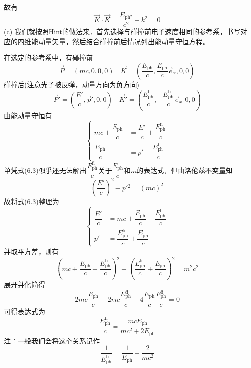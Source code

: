 \begin{solution}
故有
\[\vec{K}\cdot\vec{K}=\dfrac{E_{\mathrm{ph}{}^2}}{c^2}-k^2=0\]
(c) 我们就按照Hint的做法来，首先选择与碰撞前电子速度相同的参考系，书写对应的四维能动量矢量，然后结合碰撞前后情况列出能动量守恒方程。

在选定的参考系中，有碰撞前
\begin{equation}
	\vec{P} = (mc,0,0,0)\quad\vec{K}=(\dfrac{E_{\mathrm{ph}}}{c},\dfrac{E_{\mathrm{ph}}}{c}\vec{e}_x,0,0)
\end{equation}
碰撞后(注意光子被反弹，动量方向为负方向)
\begin{equation}
	\vec{P}'=(\dfrac{E'}{c},\vec{p}',0,0)\quad\vec{K}'=(\dfrac{E_{\mathrm{ph}}^{\mathrm{fi}}}{c},-\dfrac{E_{\mathrm{ph}}^{\mathrm{fi}}}{c}\vec{e}_x,0,0)
\end{equation}
由能动量守恒有
\begin{equation}
	\left\{
		\begin{aligned}
			mc+\dfrac{E_{\mathrm{ph}}}{c}&=\dfrac{E'}{c}+\dfrac{E_{\mathrm{ph}}^{\mathrm{fi}}}{c}\\
			\dfrac{E_{\mathrm{ph}}}{c}&=p'-\dfrac{E_{\mathrm{ph}}^{\mathrm{fi}}}{c}
		\end{aligned}
	\right.
\end{equation}
单凭式(6.3)似乎还无法解出$\dfrac{E_{\mathrm{ph}}^{\mathrm{fi}}}{c}$关于$ \dfrac{E_{\mathrm{ph}}}{c}$和$m$的表达式，但由洛伦兹不变量知
\begin{equation}
	\left(\dfrac{E'}{c}\right)^2-p'{}^2=(mc)^2
\end{equation}
故将式(6.3)整理为
\begin{equation}
	\left\{
	\begin{aligned}
		\dfrac{E'}{c}&=mc+\dfrac{E_{\mathrm{ph}}}{c}-\dfrac{E_{\mathrm{ph}}^{\mathrm{fi}}}{c}\\
		p'&=\dfrac{E_{\mathrm{ph}}^{\mathrm{fi}}}{c}+\dfrac{E_{\mathrm{ph}}}{c}
	\end{aligned}
	\right.
\end{equation}
并取平方差，则有
\begin{equation}
	\left(mc+\dfrac{E_{\mathrm{ph}}}{c}-\dfrac{E_{\mathrm{ph}}^{\mathrm{fi}}}{c}\right)^2-\left(\dfrac{E_{\mathrm{ph}}^{\mathrm{fi}}}{c}+\dfrac{E_{\mathrm{ph}}}{c}\right)^2=m^2c^2
\end{equation}
展开并化简得
\begin{equation}
	2mc\dfrac{E_{\mathrm{ph}}}{c}-2mc\dfrac{E_{\mathrm{ph}}^{\mathrm{fi}}}{c}-4\dfrac{E_{\mathrm{ph}}}{c}\dfrac{E_{\mathrm{ph}}^{\mathrm{fi}}}{c}=0
\end{equation}
可得表达式为
\begin{equation}
	\dfrac{E_{\mathrm{ph}}^{\mathrm{fi}}}{c}=\dfrac{mcE_{\mathrm{ph}}}{mc^2+2E_{\mathrm{ph}}}
\end{equation}
注：一般我们会将这个关系记作
\begin{equation}
	\dfrac{1}{E_{\mathrm{ph}}^{\mathrm{fi}}}=\dfrac{1}{E_{\mathrm{ph}}}+\dfrac{2}{mc^2}
\end{equation}
\end{solution}